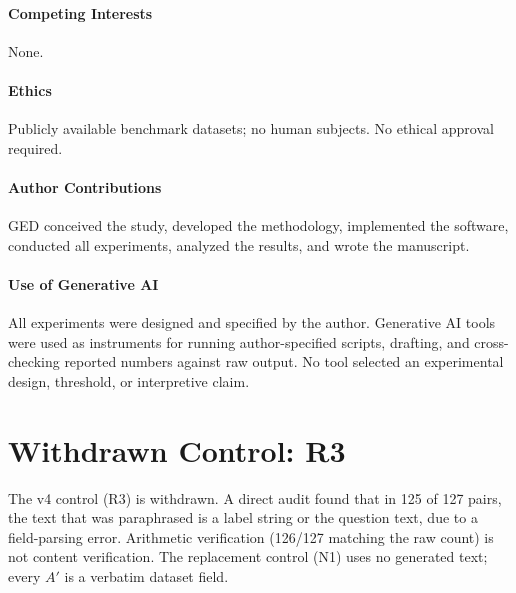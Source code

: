\documentclass[11pt,a4paper]{article}
\begin{document}
\paragraph{Competing Interests} None.
\paragraph{Ethics} Publicly available benchmark datasets; no human subjects. No ethical approval required.
\paragraph{Author Contributions} GED conceived the study, developed the methodology, implemented the software, conducted all experiments, analyzed the results, and wrote the manuscript.
\paragraph{Use of Generative AI} All experiments were designed and specified by the author. Generative AI tools were used as instruments for running author-specified scripts, drafting, and cross-checking reported numbers against raw output. No tool selected an experimental design, threshold, or interpretive claim.

\appendix
\section{Withdrawn Control: R3}
\label{app:r3-withdrawn}

The v4 control (R3) is withdrawn. A direct audit found that in 125 of 127 pairs, the text that was paraphrased is a label string or the question text, due to a field-parsing error. Arithmetic verification (126/127 matching the raw count) is not content verification. The replacement control (N1) uses no generated text; every $A'$ is a verbatim dataset field.
\end{document}
